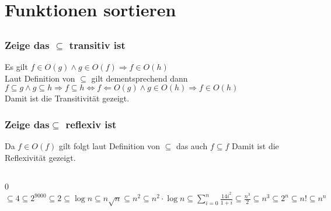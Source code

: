 \section{Funktionen sortieren}
\subsection{}
\subsubsection{Zeige das $\subseteq{}$ transitiv ist}
Es gilt $f\in O(g) \wedge g \in O(f)\Rightarrow f\in O(h)$\\
Laut Definition von $\subseteq{}$ gilt dementsprechend dann\\
$f\subseteq{}g \wedge g \subseteq{}h \Rightarrow f \subseteq{}h \Leftrightarrow f \Leftarrow O(g) \wedge g \in O(h) \Rightarrow f \in O(h)$\\
Damit ist die Transitivität gezeigt.
\subsubsection{Zeige das$\subseteq{}$  reflexiv ist}
Da $f \in O(f)$ gilt folgt laut Definition von $\subseteq{}$ das auch $f\subseteq{}f$ 
Damit ist die Reflexivität gezeigt.
\subsection{}
0$\subseteq 4 \subseteq 2^9000 \subseteq 2 \subseteq \log{n} \subseteq n \sqrt{n} \subseteq n^2 \subseteq n^2 \cdot \log{n} \subseteq \sum\nolimits_{i=0}^n \frac{14i^2}{1+i} \subseteq \frac{n^3}{2} \subseteq n^3 \subseteq 2^n \subseteq n! \subseteq n^n$ 